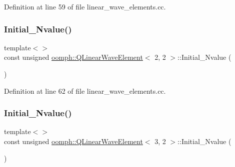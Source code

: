 Definition at line 59 of file linear\+\_\+wave\+\_\+elements.\+cc.

\mbox{\label{classoomph_1_1QLinearWaveElement_a12e7b5f35ca4ab8c9c40e3d4babbfdaf}} 
\subsubsection{\texorpdfstring{Initial\+\_\+\+Nvalue()}{Initial\_Nvalue()}\hspace{0.1cm}{\footnotesize\ttfamily [6/9]}}
{\footnotesize\ttfamily template$<$$>$ \\
const unsigned \hyperlink{classoomph_1_1QLinearWaveElement}{oomph\+::\+Q\+Linear\+Wave\+Element}$<$ 2, 2 $>$\+::Initial\+\_\+\+Nvalue (\begin{DoxyParamCaption}{ }\end{DoxyParamCaption})\hspace{0.3cm}{\ttfamily [private]}}



Definition at line 62 of file linear\+\_\+wave\+\_\+elements.\+cc.

\mbox{\label{classoomph_1_1QLinearWaveElement_ab0d1291bd078c6afef247eb958195732}} 
\subsubsection{\texorpdfstring{Initial\+\_\+\+Nvalue()}{Initial\_Nvalue()}\hspace{0.1cm}{\footnotesize\ttfamily [7/9]}}
{\footnotesize\ttfamily template$<$$>$ \\
const unsigned \hyperlink{classoomph_1_1QLinearWaveElement}{oomph\+::\+Q\+Linear\+Wave\+Element}$<$ 3, 2 $>$\+::Initial\+\_\+\+Nvalue (\begin{DoxyParamCaption}{ }\end{DoxyParamCaption})\hspace{0.3cm}{\ttfamily [private]}}




